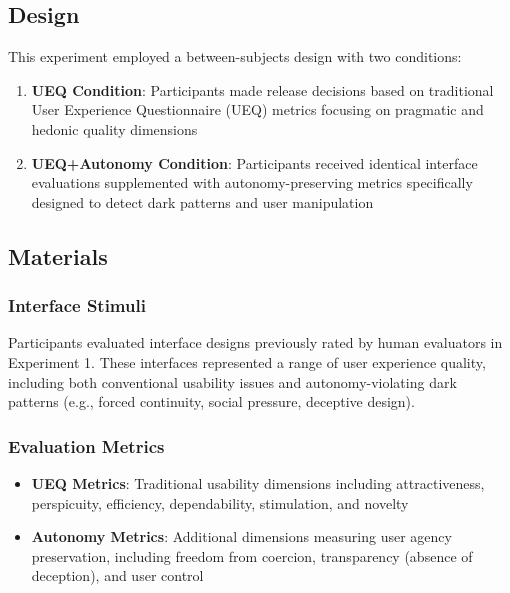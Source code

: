 \subsection{Design}
This experiment employed a between-subjects design with two conditions:
\begin{enumerate}
    \item \textbf{UEQ Condition}: Participants made release decisions based on traditional User Experience Questionnaire (UEQ) metrics focusing on pragmatic and hedonic quality dimensions
    \item \textbf{UEQ+Autonomy Condition}: Participants received identical interface evaluations supplemented with autonomy-preserving metrics specifically designed to detect dark patterns and user manipulation
\end{enumerate}

\subsection{Materials}
\subsubsection{Interface Stimuli}
Participants evaluated \texttt{} interface designs previously rated by human evaluators in Experiment 1. These interfaces represented a range of user experience quality, including both conventional usability issues and autonomy-violating dark patterns (e.g., forced continuity, social pressure, deceptive design).

\subsubsection{Evaluation Metrics}
\begin{itemize}
    \item \textbf{UEQ Metrics}: Traditional usability dimensions including attractiveness, perspicuity, efficiency, dependability, stimulation, and novelty
    \item \textbf{Autonomy Metrics}: Additional dimensions measuring user agency preservation, including freedom from coercion, transparency (absence of deception), and user control
\end{itemize}

